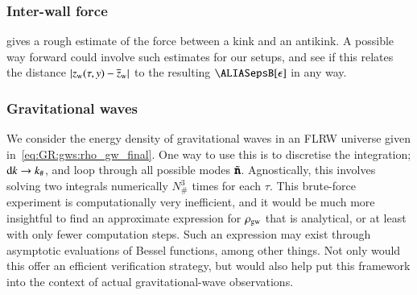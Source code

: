     \subsubsection{Inter-wall force}
     gives a rough estimate of the force between a kink and an antikink. A possible way forward could involve such estimates for our setups, and see if this relates the distance $\abs{z_\mathrm{w}(\tau,y) - \overline{z}_\mathrm{w}}$ to the resulting $\epsB[\epsilon]$ in any way. 


    \subsubsection{Gravitational waves}
    We consider the energy density of gravitational waves in an FLRW universe given in~\cref{eq:GR:gws:rho_gw_final}. 
    One way to use this is to discretise the integration; $\diff k \to k_\#$, and loop through all possible modes $\tilde{\boldsymbol{\mathtt{n}}}$. Agnostically, this involves solving two integrals numerically $N_\#^3$ times for each $\tau$. This brute-force experiment is computationally very inefficient, and it would be much more insightful to find an approximate expression for $\rho_\mathrm{gw}$ that is analytical, or at least with only fewer computation steps. %
    Such an expression may exist through asymptotic evaluations of Bessel functions, among other things. Not only would this offer an efficient verification strategy, but would also help put this framework into the context of actual gravitational-wave observations.

